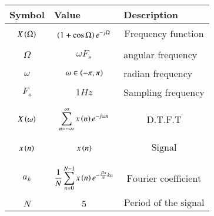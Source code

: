 \begin{tabular}{|p{2cm}|p{2.80cm}|p{2.70cm}|}
    \hline
    Symbol&Value&Description\\ \hline
    $$X\left(\Omega\right)$$&$$\left(1+\cos{\Omega}\right)e^{-j\Omega}$$&$$\text{Frequency function}$$\\\hline
    $$\Omega$$&$$\omega F_{s}$$&angular frequency\\\hline
    $$\omega$$&$$\omega \in \left(-\pi,\pi\right)$$&radian frequency\\\hline
    $$F_{s}$$&$$1Hz$$&Sampling frequency\\\hline
    $$X\left(\omega\right)$$&$$\sum^{\infty}_{n=-\infty}x\left(n\right)e^{-j\omega n}$$&$$\text{D.T.F.T}$$\\\hline
    $$x\left(n\right)$$&$$x\left(n\right)$$&$$\text{Signal}$$\\\hline
    $$a_k$$&$$\frac{1}{N}\sum^{N-1}_{n=0}x\left(n\right)e^{-\frac{j2\pi}{N}kn}$$&$$\text{Fourier coefficient}$$\\\hline
    $$N$$&$$5$$&$$\text{Period of the signal}$$\\\hline
\end{tabular}